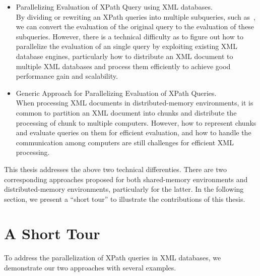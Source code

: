 \begin{itemize} 
	\item Parallelizing Evaluation of XPath Query using XML databases.\\  
	By dividing or rewriting an XPath queries into multiple subqueries, such
	as~\cite{BoLS09,Bord10},  we can convert the evaluation of the original query to
	the evaluation of these subqueries. However, there is a technical difficulty as
	to figure out how to parallelize the evaluation of an single query by exploiting
	existing XML database engines, particularly how to distribute an XML document to 
	multiple XML databases and process them efficiently to achieve good 
	performance gain and scalability.
	
	\item Generic Approach for Parallelizing Evaluation of XPath Queries.\\
	When processing XML documents in distributed-memory environments, it is common
	to partition an XML document into chunks and distribute the processing of chunk
	to multiple computers. However, how to represent chunks and evaluate queries on
	them for efficient evaluation, and how to handle the communication among
	computers are still challenges for efficient XML processing. \end{itemize}

This thesis addresses the above two technical differenties. There are two
corresponding approaches proposed for both shared-memory environments and
distributed-memory environments, particularly for the latter. In the following
section, we present a ``short tour'' to illustrate the contributions of this
thesis.

\section{A Short Tour}

To address the parallelization of XPath queries in XML databases, we demonstrate
our two approaches with several examples.

